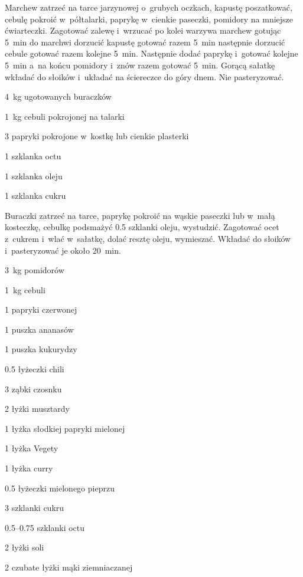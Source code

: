 \documentclass[../main.tex]{subfiles}
\begin{document}
Marchew zatrzeć na tarce jarzynowej o~grubych oczkach, kapustę poszatkować,
cebulę pokroić w~półtalarki, paprykę w~cienkie paseczki, pomidory na mniejsze
ćwiarteczki. Zagotować zalewę i~wrzucać po kolei warzywa marchew gotując
\qty{5}{\minute} do marchwi dorzucić kapustę gotować razem \qty{5}{\minute}
następnie dorzucić cebule gotować razem kolejne \qty{5}{\minute}. Następnie
dodać paprykę i~gotować kolejne \qty{5}{\minute} a~na końcu pomidory i~znów
razem gotować \qty{5}{\minute}. Gorącą sałatkę wkładać do słoików i~układać na
ściereczce do góry dnem. Nie pasteryzować.


\begin{Ingred}
    \item \qty{4}{\kilo\gram} ugotowanych buraczków
    \item \qty{1}{\kilo\gram} cebuli pokrojonej na talarki
    \item \num{3} papryki pokrojone w~kostkę lub cienkie plasterki
    \item \num{1} szklanka octu
    \item \num{1} szklanka oleju
    \item \num{1} szklanka cukru
\end{Ingred}

Buraczki zatrzeć na tarce, paprykę pokroić na wąskie paseczki lub w~małą
kosteczkę, cebulkę podsmażyć \num{0.5} szklanki oleju, wystudzić. Zagotować
ocet z~cukrem i~wlać w~sałatkę, dolać resztę oleju, wymieszać. Wkładać do
słoików i~pasteryzować je około \qty{20}{\minute}.


\begin{Ingred}
    \item \qty{3}{\kilo\gram} pomidorów
    \item \qty{1}{\kilo\gram} cebuli
    \item \num{1} papryki czerwonej
    \item \num{1} puszka ananasów
    \item \num{1} puszka kukurydzy
    \item \num{0.5} łyżeczki chili
    \item \num{3} ząbki czosnku
    \item \num{2} łyżki musztardy
    \item \num{1} łyżka słodkiej papryki mielonej
    \item \num{1} łyżka Vegety
    \item \num{1} łyżka curry
    \item \num{0.5} łyżeczki mielonego pieprzu
    \item \num{3} szklanki cukru
    \item \numrange{0.5}{0.75} szklanki octu
    \item \num{2} łyżki soli
    \item \num{2} czubate łyżki mąki ziemniaczanej
\end{Ingred}
\end{document}
